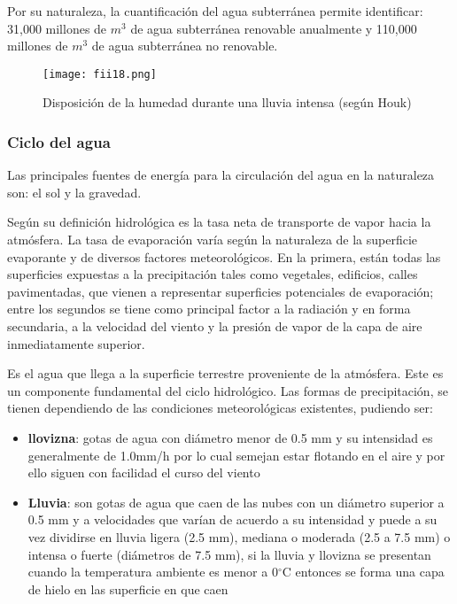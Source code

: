 Por su naturaleza, la cuantificación del agua subterránea permite identificar:
31,000 millones de $m^3$ de agua subterránea renovable anualmente y 110,000 millones
de $ m^3$ de agua subterránea no renovable.

\begin{figure}[h!]
	\centerline{\texttt{[image: fii18.png]}}
	\caption{Disposición de la humedad durante una lluvia intensa (según Houk)}
	\label{fii18}
\end{figure}

\subsubsection{Ciclo del agua}
Las principales fuentes de energía para la circulación del agua en la naturaleza
son: el sol y la gravedad.
\begin{definition}[Evaporación]
	Según su definición hidrológica es la tasa neta de
	transporte de vapor hacia la atmósfera.
	La tasa de evaporación varía según la naturaleza de la superficie evaporante y
	de diversos factores meteorológicos. En la primera, están todas las superficies
	expuestas a la precipitación tales como vegetales, edificios, calles pavimentadas, que
	vienen a representar superficies potenciales de evaporación; entre los segundos se
	tiene como principal factor a la radiación y en forma secundaria, a la velocidad del
	viento y la presión de vapor de la capa de aire inmediatamente superior.
\end{definition}

\begin{definition}[Precipitación]
	Es el agua que llega a la superficie terrestre proveniente de la
	atmósfera. Este es un componente fundamental del ciclo hidrológico.
	Las formas de precipitación, se tienen dependiendo de las condiciones
	meteorológicas existentes, pudiendo ser:
\end{definition}
\begin{itemize}
	\item \textbf{llovizna}: gotas de agua con diámetro
	      menor de 0.5 mm y su intensidad es generalmente de 1.0mm/h por lo cual semejan
	      estar flotando en el aire y por ello siguen con facilidad el curso del viento
	\item \textbf{Lluvia}: son
	      gotas de agua que caen de las nubes con un diámetro superior a 0.5 mm y a
	      velocidades que varían de acuerdo a su intensidad y puede a su vez dividirse en lluvia
	      ligera (2.5 mm), mediana o moderada (2.5 a 7.5 mm) o intensa o fuerte (diámetros de
	      7.5 mm), si la lluvia y llovizna se presentan cuando la temperatura ambiente es menor a
	      0$^{\circ}$C entonces se forma una capa de hielo en las superficie en que caen
\end{itemize}

